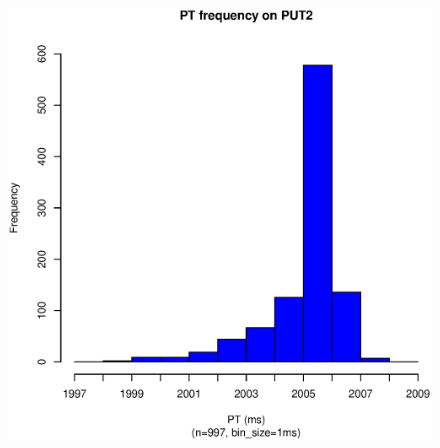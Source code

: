 \documentclass[10pt]{article}
\begin{document}
\begin{figure}[hp!]
{		\includegraphics[scale=0.43]{2_sec_pt_hist2.eps}
		\label{fig:put2_hist2}
	}
\end{figure}
\end{document}
